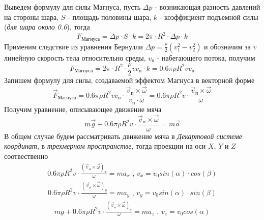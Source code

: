 \documentclass[a5paper, 10pt]{article}
\theoremstyle{definition}
\theoremstyle{plain}
\theoremstyle{remark}
\begin{document}
Выведем формулу для силы Магнуса, пусть $\Delta p $ - возникающая разность давлений на стороны шара, $S$ - площадь половины шара,  $k$ - коэффициент подъемной силы (\textit{для шара около 0.6}), тогда
\begin{equation}
F_{\text{Магнуса}}= \Delta p \cdot S\cdot k = 2 \pi \cdot R^{2} \cdot \Delta p \cdot k
\end{equation}
Применим следствие из уравнения Бернулли $\Delta p = \frac{\rho}{2} \left( v^{2}_{1}- v^{2}_{2} \right)$ и обозначим за $v$ линейную скорость тела относительно среды, $v_{\text{п}}$ - набегающего потока, получим
\begin{equation}
F_{\text{Магнуса}}= 2 \pi \cdot R^{2} \cdot \frac{\rho}{2} v v_{\text{п}} \cdot k = 0.6 \pi \rho  R^{2}  v v_{\text{п}}
\end{equation}
Запишем формулу для силы, создаваемой эффектом Магнуса в векторной форме
\begin{equation}
\vec{F}_{\text{Магнуса}}= 0.6 \pi \rho  R^{2} v v_{\text{п}} \cdot  \frac{   \vec{v}_{\text{п}} \times \vec{\omega}}{ v_{\text{п}} \cdot \omega} = 0.6 \pi \rho  R^{2} v  \cdot  \frac{   \vec{v}_{\text{п}} \times \vec{\omega}}{  \omega}
\end{equation}
Получим уравнение, описывающее движение мяча
\begin{equation}
m \vec{g}  +0.6 \pi \rho  R^{2} v  \cdot  \frac{   \vec{v}_{\text{п}} \times \vec{\omega}}{  \omega} = m \vec{a}
\end{equation}
В общем случае будем рассматривать движение мяча в \textit{Декартовой системе координат}, в \textit{трехмерном пространстве}, тогда проекции на оси $X$, $Y$ и $Z$ соотвественно
\begin{multline}
0.6 \pi \rho  R^{2} v  \cdot  \frac{  \left( \vec{v}_{\text{п}} \times \vec{\omega} \right)_{x}}{  \omega} = m a_{x} \text{ , } v_{x} = v_0 sin \left( \alpha \right) \cdot cos  \left( \beta \right)
\end{multline}
\begin{multline}
0.6 \pi \rho  R^{2} v  \cdot  \frac{  \left( \vec{v}_{\text{п}} \times \vec{\omega} \right)_{y}}{  \omega} = m a_{y} \text{ , } v_{y} = v_0 sin \left( \alpha \right) \cdot sin  \left( \beta \right)
\end{multline}
\begin{multline}
m g +0.6 \pi \rho  R^{2} v  \cdot  \frac{  \left( \vec{v}_{\text{п}} \times \vec{\omega} \right)_{z}}{  \omega} = m a_{z} \text{ , } v_{z} = v_0 cos \left( \alpha \right)
\end{multline}
\end{document}
